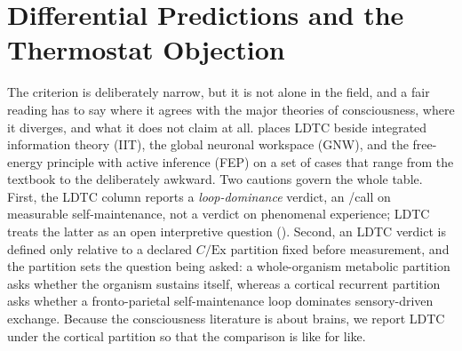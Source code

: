 \documentclass[11pt]{article}
\begin{document}
\begin{table}[ht]
\centering
\caption{Necessary-condition contrast under measurement and modeling sweeps (), $4$ seeds per cell. Each entry is the across-seed mean of the per-seed median $M$ (dB) with a $95\%$ bootstrap CI, for the positive control and the loop-ablated negative.}
\label{tab:sensitivity}
\resizebox{\textwidth}{!}{}
\end{table}


\section{Differential Predictions and the Thermostat Objection}
\label{sec:differential}

The criterion is deliberately narrow, but it is not alone in the field, and a fair reading has to say where it agrees with the major theories of consciousness, where it diverges, and what it does not claim at all.  places LDTC beside integrated information theory (IIT), the global neuronal workspace (GNW), and the free-energy principle with active inference (FEP) on a set of cases that range from the textbook to the deliberately awkward. Two cautions govern the whole table. First, the LDTC column reports a \emph{loop-dominance} verdict, an \NC/\SC call on measurable self-maintenance, not a verdict on phenomenal experience; LDTC treats the latter as an open interpretive question (). Second, an LDTC verdict is defined only relative to a declared $C/\text{Ex}$ partition fixed before measurement, and the partition sets the question being asked: a whole-organism metabolic partition asks whether the organism sustains itself, whereas a cortical recurrent partition asks whether a fronto-parietal self-maintenance loop dominates sensory-driven exchange. Because the consciousness literature is about brains, we report LDTC under the cortical partition so that the comparison is like for like.
\end{document}
